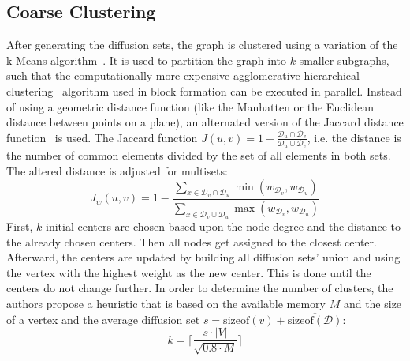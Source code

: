     \subsection*{Coarse Clustering}
    After generating the diffusion sets, the graph is clustered using a variation of the k-Means algorithm~\autocite{lloyd1982least}. 
    It is used to partition the graph into $k$ smaller subgraphs, such that the computationally more expensive agglomerative hierarchical clustering~\autocite{hac} algorithm used in block formation can be executed in parallel.
    Instead of using a geometric distance function (like the Manhatten or the Euclidean distance between points on a plane), an alternated version of the Jaccard distance function~\autocite{jaccard1912distribution} is used. 
    The Jaccard function $J(u, v) = 1 - \frac{\mathcal{D}_u \cap \mathcal{D}_v}{\mathcal{D}_u \cup \mathcal{D}_v}$, i.e. the distance is the number of common elements divided by the set of all elements in both sets. 
    The altered distance is adjusted for multisets:  
    \[J_w (u, v) = 1 - \frac{\sum_{x \in \mathcal{D}_v \cap \mathcal{D}_u} \min (w_{\mathcal{D}_v}, w_{\mathcal{D}_u})}{\sum_{x \in \mathcal{D}_v \cup \mathcal{D}_u} \max (w_{\mathcal{D}_v}, w_{\mathcal{D}_u})} \]
    First, $k$ initial centers are chosen based upon the node degree and the distance to the already chosen centers.
    Then all nodes get assigned to the closest center. 
    Afterward, the centers are updated by building all diffusion sets' union and using the vertex with the highest weight as the new center.
    This is done until the centers do not change further.
    In order to determine the number of clusters, the authors propose a heuristic that is based on the available memory $M$ and the size of a vertex and the average diffusion set $s = \text{sizeof}(v) + \overline{\text{sizeof}(\mathcal{D})}$: 
    \[ k = \lceil \frac{s \cdot |V|}{\sqrt{0.8 \cdot M}} \rceil \]
    
